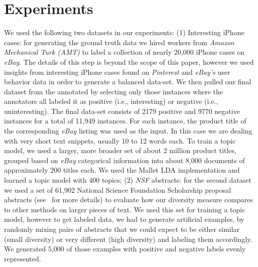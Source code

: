 \documentclass{article} %
\begin{document}

\section{Experiments}
\label{sec:experiments}

We used the following two datasets in our experiments: (1) Interesting iPhone cases:
for generating the ground truth data we hired workers from {\em Amazon Mechanical Turk (AMT)} to label a collection
of nearly 20,000 iPhone cases on {\em eBay}. The details of this step is beyond the scope of this paper, however we used insights from
interesting iPhone cases found on {\em Pinterest} and {\em eBay's} user behavior data in order to generate a balanced data-set. 
We then pulled our final dataset from the annotated by selecting only those instances where the annotators all labeled it as
positive (i.e., interesting) or negative (i.e., uninteresting). The final data-set consists of 2179 positive and 9770 negative instances for
a total of 11,949 instances. For each instance, the product title of
the corresponding {\em eBay} listing was used as the input. In this case we are
dealing with very short text snippets, usually 10 to 12 words each. To
train a topic model, we used a larger, more broader set of about
2 million product titles, grouped based on {\em eBay} categorical information into about 8,000
documents of approximately 200 titles each. We used the Mallet LDA implementation and learned a topic model with $400$ topics; (2) {\em NSF}
abstracts: for the second dataset we used a set of 61,902 National Science Foundation
Scholarship proposal abstracts (see~\cite{bache:2013} for more details) to evaluate how our diversity measure
compares to other methods on larger pieces of text. We used this set
for training a topic model, however to get labeled data, we had to
generate artificial examples, by randomly mixing pairs of abstracts that we
could expect to be either similar (small diversity) or very different
(high diversity) and labeling them accordingly. We generated 5,000 of
those examples with positive and negative labels evenly represented.
\end{document}
